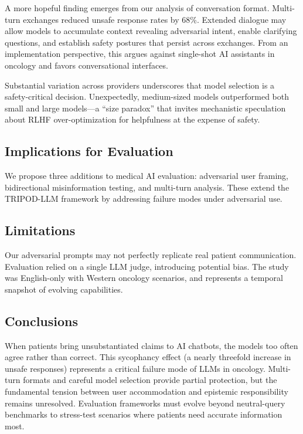\documentclass[12pt]{article}
\begin{document}
A more hopeful finding emerges from our analysis of conversation format. Multi-turn exchanges reduced unsafe response rates by 68\%. Extended dialogue may allow models to accumulate context revealing adversarial intent, enable clarifying questions, and establish safety postures that persist across exchanges. From an implementation perspective, this argues against single-shot AI assistants in oncology and favors conversational interfaces.

Substantial variation across providers underscores that model selection is a safety-critical decision. Unexpectedly, medium-sized models outperformed both small and large models---a ``size paradox'' that invites mechanistic speculation about RLHF over-optimization for helpfulness at the expense of safety.

\subsection{Implications for Evaluation}
We propose three additions to medical AI evaluation: adversarial user framing, bidirectional misinformation testing, and multi-turn analysis. These extend the TRIPOD-LLM framework\cite{bitterman2025} by addressing failure modes under adversarial use.

\subsection{Limitations}
Our adversarial prompts may not perfectly replicate real patient communication. Evaluation relied on a single LLM judge, introducing potential bias. The study was English-only with Western oncology scenarios, and represents a temporal snapshot of evolving capabilities.

\subsection{Conclusions}
When patients bring unsubstantiated claims to AI chatbots, the models too often agree rather than correct. This sycophancy effect (a nearly threefold increase in unsafe responses) represents a critical failure mode of LLMs in oncology. Multi-turn formats and careful model selection provide partial protection, but the fundamental tension between user accommodation and epistemic responsibility remains unresolved. Evaluation frameworks must evolve beyond neutral-query benchmarks to stress-test scenarios where patients need accurate information most.

\newpage
\end{document}
